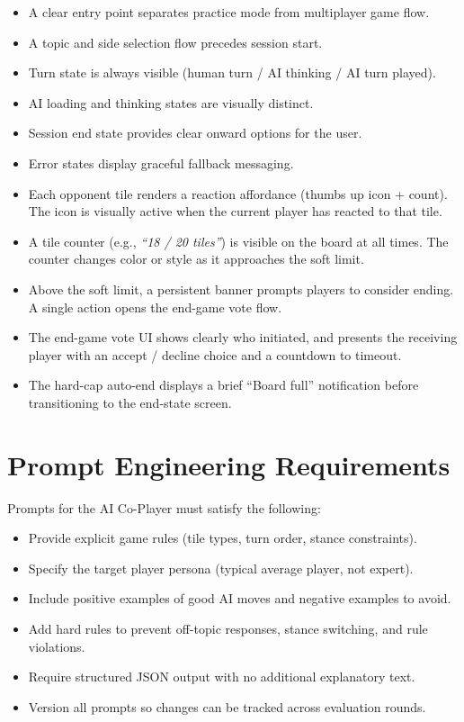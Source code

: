 \documentclass[11pt]{article}
\begin{document}
\begin{itemize}
  \item A clear entry point separates practice mode from multiplayer game flow.
  \item A topic and side selection flow precedes session start.
  \item Turn state is always visible (human turn / AI thinking / AI turn played).
  \item AI loading and thinking states are visually distinct.
  \item Session end state provides clear onward options for the user.
  \item Error states display graceful fallback messaging.
  \item Each opponent tile renders a reaction affordance (thumbs up icon + count). The icon
        is visually active when the current player has reacted to that tile.
  \item A tile counter (e.g., \textit{``18 / 20 tiles''}) is visible on the board at all times.
        The counter changes color or style as it approaches the soft limit.
  \item Above the soft limit, a persistent banner prompts players to consider ending. A single
        action opens the end-game vote flow.
  \item The end-game vote UI shows clearly who initiated, and presents the receiving player
        with an accept / decline choice and a countdown to timeout.
  \item The hard-cap auto-end displays a brief ``Board full'' notification before transitioning
        to the end-state screen.
\end{itemize}

\section{Prompt Engineering Requirements}

Prompts for the AI Co-Player must satisfy the following:

\begin{itemize}
  \item Provide explicit game rules (tile types, turn order, stance constraints).
  \item Specify the target player persona (typical average player, not expert).
  \item Include positive examples of good AI moves and negative examples to avoid.
  \item Add hard rules to prevent off-topic responses, stance switching, and rule violations.
  \item Require structured JSON output with no additional explanatory text.
  \item Version all prompts so changes can be tracked across evaluation rounds.
\end{itemize}
\end{document}
